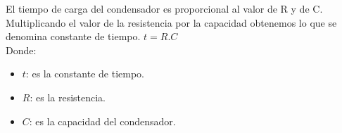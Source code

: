 \begin{enumerate}
	El tiempo de carga del condensador es proporcional al valor de R y de C. Multiplicando el valor de la resistencia por la capacidad obtenemos lo que se denomina constante de tiempo.
	$t = R.C $\\
	Donde:
	\begin{itemize}
		\item $t$: es la constante de tiempo.
		\item $R$: es la resistencia.
		\item $C$: es la capacidad del condensador.
	\end{itemize}
\end{enumerate}
